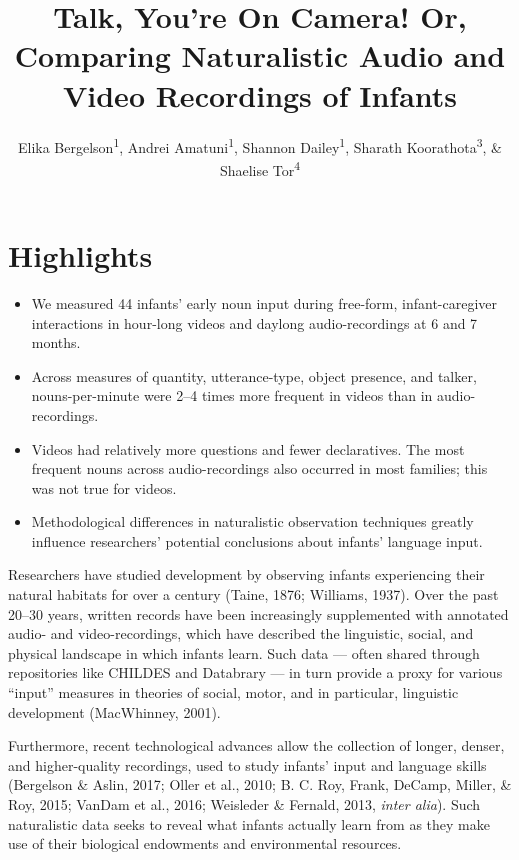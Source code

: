 \documentclass[man]{apa6}
\title{Talk, You're On Camera! Or, Comparing Naturalistic Audio and Video
Recordings of Infants}
\author{Elika Bergelson\textsuperscript{1}, Andrei Amatuni\textsuperscript{1}, Shannon Dailey\textsuperscript{1}, Sharath Koorathota\textsuperscript{3}, \& Shaelise Tor\textsuperscript{4}}
\affiliation{
    \vspace{0.5cm}
          \textsuperscript{1} Duke University\\
          \textsuperscript{2} University of Rochester\\
          \textsuperscript{3} Columbia University Medical Center\\
          \textsuperscript{4} Syracuse University  }
\providecommand{\tightlist}{%
  \setlength{\itemsep}{0pt}\setlength{\parskip}{0pt}}
\theoremstyle{definition}
\theoremstyle{definition}
\theoremstyle{definition}
\theoremstyle{remark}
\begin{document}
\maketitle

\setcounter{secnumdepth}{0}



\section{Highlights}\label{highlights}

\begin{itemize}
\tightlist
\item
  We measured 44 infants' early noun input during free-form,
  infant-caregiver interactions in hour-long videos and daylong
  audio-recordings at 6 and 7 months.
\item
  Across measures of quantity, utterance-type, object presence, and
  talker, nouns-per-minute were 2--4 times more frequent in videos than
  in audio-recordings.
\item
  Videos had relatively more questions and fewer declaratives. The most
  frequent nouns across audio-recordings also occurred in most families;
  this was not true for videos.
\item
  Methodological differences in naturalistic observation techniques
  greatly influence researchers' potential conclusions about infants'
  language input.
\end{itemize}

Researchers have studied development by observing infants experiencing
their natural habitats for over a century (Taine, 1876; Williams, 1937).
Over the past 20--30 years, written records have been increasingly
supplemented with annotated audio- and video-recordings, which have
described the linguistic, social, and physical landscape in which
infants learn. Such data --- often shared through repositories like
CHILDES and Databrary --- in turn provide a proxy for various
\enquote{input} measures in theories of social, motor, and in
particular, linguistic development (MacWhinney, 2001).

Furthermore, recent technological advances allow the collection of
longer, denser, and higher-quality recordings, used to study infants'
input and language skills (Bergelson \& Aslin, 2017; Oller et al., 2010;
B. C. Roy, Frank, DeCamp, Miller, \& Roy, 2015; VanDam et al., 2016;
Weisleder \& Fernald, 2013, \emph{inter alia}). Such naturalistic data
seeks to reveal what infants actually learn from as they make use of
their biological endowments and environmental resources.
\end{document}

